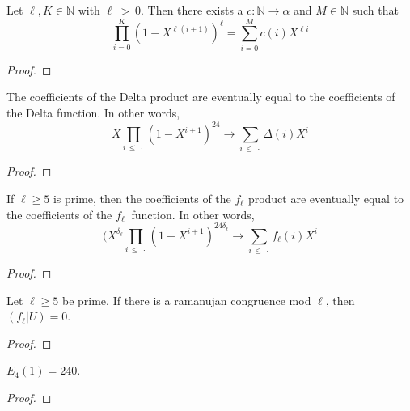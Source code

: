 \begin{lemma}
  \label{lem:prod_eq_sum}
  \leanok
  Let $\ell, K \in \mathbb{N}$ with $\ell \: > \: 0$. Then there exists a  $c : \mathbb{N} \to \alpha$ 
  and $M \in \mathbb{N}$ such that 
  \[ \prod _{i = 0}^{K} (1 - X ^ {\ell (i + 1)}) ^ \ell = 
      \sum_{i = 0}^{M} c (i) X ^ {\ell i} \]
\end{lemma}
\begin{proof}
  \leanok
\end{proof}

\begin{theorem}
  \label{thm:DeltaProduct_eventually_sum}
  \leanok
  The coefficients of the Delta product are eventually equal to the coefficients of the Delta function.
  In other words, 
  \[ X \prod_{i \, \le \: \cdot} (1 - X ^ {i + 1}) ^ {24} \longrightarrow 
    \sum_{i \, \le \: \cdot} \Delta (i) X ^ i \]
\end{theorem}
\begin{proof}
  \leanok
\end{proof}

\begin{theorem}
  \label{thm:flProduct_eventually_sum}
  \leanok
  If $\ell \ge 5$ is prime, then
  the coefficients of the $f_\ell$ product are eventually equal to the coefficients of the $f_\ell \:$ function.
  In other words,
  \[ (X ^ {\delta_\ell} \prod_{i \, \le \: \cdot} (1 - X ^ {i + 1}) ^ {24 \delta_\ell} \longrightarrow 
    \sum_{i \, \le \: \cdot} f_\ell (i) X ^ i \]
\end{theorem}
\begin{proof}
  \leanok
\end{proof}


\begin{theorem} 
  \label{thm:flu_eq_zero}
  \leanok
  Let $\ell \ge 5$ be prime. If there is a ramanujan congruence mod $\ell$,
  then $(f_\ell | U) = 0.$
\end{theorem}
\begin{proof}
  \leanok
\end{proof}


\begin{theorem}
  \label{thm:Eis_four_one}
  \leanok
  $E_4 (1) = 240$.
\end{theorem}
\begin{proof}
  \leanok
\end{proof}


